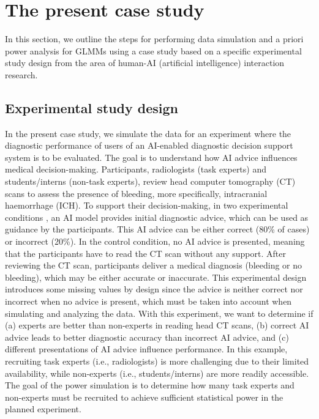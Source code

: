 \documentclass[
  man,floatsintext]{apa6}
\begin{document}
\hypertarget{the-present-case-study}{%
\section{The present case study}\label{the-present-case-study}}

In this section, we outline the steps for performing data simulation and a priori power analysis for GLMMs using a case study based on a specific experimental study design from the area of human-AI (artificial intelligence) interaction research.

\hypertarget{experimental-study-design}{%
\subsection{Experimental study design}\label{experimental-study-design}}

In the present case study, we simulate the data for an experiment where the diagnostic performance of users of an AI-enabled diagnostic decision support system is to be evaluated.
The goal is to understand how AI advice influences medical decision-making. Participants, radiologists (task experts) and students/interns (non-task experts), review head computer tomography (CT) scans to assess the presence of bleeding, more specifically, intracranial haemorrhage (ICH).
To support their decision-making, in two experimental conditions , an AI model provides initial diagnostic advice, which can be used as guidance by the participants. This AI advice can be either correct (80\% of cases) or incorrect (20\%). In the control condition, no AI advice is presented, meaning that the participants have to read the CT scan without any support. After reviewing the CT scan, participants deliver a medical diagnosis (bleeding or no bleeding), which may be either accurate or inaccurate.
This experimental design introduces some missing values by design since the advice is neither correct nor incorrect when no advice is present, which must be taken into account when simulating and analyzing the data. With this experiment, we want to determine if (a) experts are better than non-experts in reading head CT scans, (b) correct AI advice leads to better diagnostic accuracy than incorrect AI advice, and (c) different presentations of AI advice influence performance.
In this example, recruiting task experts (i.e., radiologists) is more challenging due to their limited availability, while non-experts (i.e., students/interns) are more readily accessible.
The goal of the power simulation is to determine how many task experts and non-experts must be recruited to achieve sufficient statistical power in the planned experiment.
\end{document}
